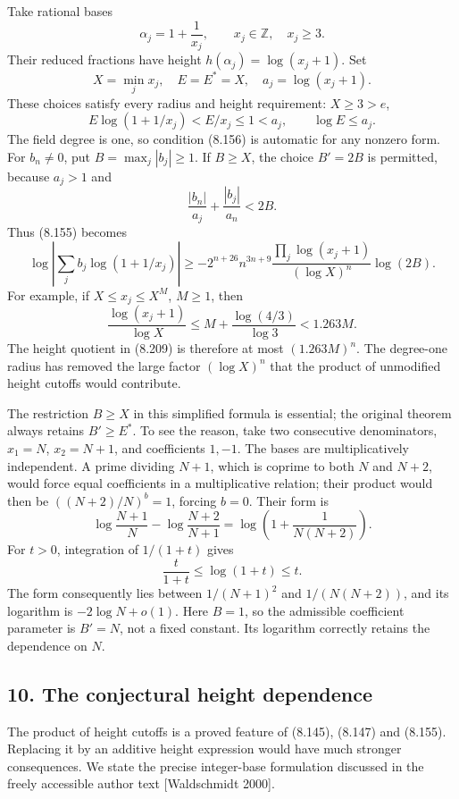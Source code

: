 \documentclass[
  11pt,
  a4paper,
]{article}
\begin{document}
Take rational bases \[
\alpha_j=1+\frac1{x_j},\qquad x_j\in\mathbb Z,\quad x_j\ge3.
\] Their reduced fractions have height \(h(\alpha_j)=\log(x_j+1)\). Set
\[
X=\min_jx_j,\quad E=E^*=X,\quad a_j=\log(x_j+1).
\] These choices satisfy every radius and height requirement:
\(X\ge3>e\), \[
E\log(1+1/x_j)<E/x_j\le1<a_j,\qquad
\log E\le a_j.
\] The field degree is one, so condition (8.156) is automatic for any
nonzero form. For \(b_n\ne0\), put \(B=\max_j|b_j|\ge1\). If \(B\ge X\),
the choice \(B'=2B\) is permitted, because \(a_j>1\) and \[
\frac{|b_n|}{a_j}+\frac{|b_j|}{a_n}<2B.
\] Thus (8.155) becomes \[
\log\left|\sum_jb_j\log(1+1/x_j)\right|
\ge-2^{n+26}n^{3n+9}
\frac{\prod_j\log(x_j+1)}{(\log X)^n}\log(2B). \tag{8.209}
\] For example, if \(X\le x_j\le X^M\), \(M\ge1\), then \[
\frac{\log(x_j+1)}{\log X}
\le M+\frac{\log(4/3)}{\log3}<1.263M.
\] The height quotient in (8.209) is therefore at most \((1.263M)^n\).
The degree-one radius has removed the large factor \((\log X)^n\) that
the product of unmodified height cutoffs would contribute.

The restriction \(B\ge X\) in this simplified formula is essential; the
original theorem always retains \(B'\ge E^*\). To see the reason, take
two consecutive denominators, \(x_1=N\), \(x_2=N+1\), and coefficients
\(1,-1\). The bases are multiplicatively independent. A prime dividing
\(N+1\), which is coprime to both \(N\) and \(N+2\), would force equal
coefficients in a multiplicative relation; their product would then be
\(((N+2)/N)^b=1\), forcing \(b=0\). Their form is \[
\log\frac{N+1}{N}-\log\frac{N+2}{N+1}
=\log\left(1+\frac1{N(N+2)}\right).
\] For \(t>0\), integration of \(1/(1+t)\) gives \[
\frac t{1+t}\le\log(1+t)\le t.
\] The form consequently lies between \(1/(N+1)^2\) and \(1/(N(N+2))\),
and its logarithm is \(-2\log N+o(1)\). Here \(B=1\), so the admissible
coefficient parameter is \(B'=N\), not a fixed constant. Its logarithm
correctly retains the dependence on \(N\).

\subsection{10. The conjectural height
dependence}\label{the-conjectural-height-dependence}

The product of height cutoffs is a proved feature of (8.145), (8.147)
and (8.155). Replacing it by an additive height expression would have
much stronger consequences. We state the precise integer-base
formulation discussed in the freely accessible author text
{[}Waldschmidt 2000{]}.
\end{document}
